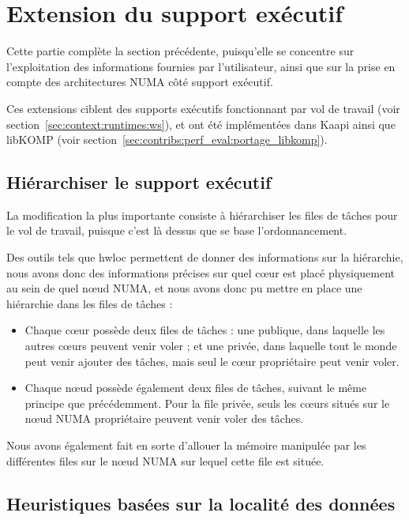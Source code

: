 \section{Extension du support exécutif}\label{sec:openmp:runtime}

Cette partie complète la section précédente, puisqu'elle se concentre sur l'exploitation des informations fournies par l'utilisateur, ainsi que sur la prise en compte des architectures NUMA côté support exécutif.

Ces extensions ciblent des supports exécutifs fonctionnant par vol de travail (voir section~\ref{sec:context:runtimes:ws}), et ont été implémentées dans Kaapi ainsi que libKOMP (voir section~\ref{sec:contribs:perf_eval:portage_libkomp}).

\subsection{Hiérarchiser le support exécutif}

La modification la plus importante consiste à hiérarchiser les files de tâches pour le vol de travail, puisque c'est là dessus que se base l'ordonnancement.

Des outils tels que hwloc permettent de donner des informations sur la hiérarchie, nous avons donc des informations précises sur quel cœur est placé physiquement au sein de quel nœud NUMA, et nous avons donc pu mettre en place une hiérarchie dans les files de tâches :

\begin{itemize}
  \item Chaque cœur possède deux files de tâches : une publique, dans laquelle les autres cœurs peuvent venir voler ; et une privée, dans laquelle tout le monde peut venir ajouter des tâches, mais seul le cœur propriétaire peut venir voler.
  \item Chaque nœud possède également deux files de tâches, suivant le même principe que précédemment. Pour la file privée, seuls les cœurs situés sur le nœud NUMA propriétaire peuvent venir voler des tâches.
\end{itemize}

Nous avons également fait en sorte d'allouer la mémoire manipulée par les différentes files sur le nœud NUMA sur lequel cette file est située.



\subsection{Heuristiques basées sur la localité des données}\label{sec:contrib:ws:heuristics}

